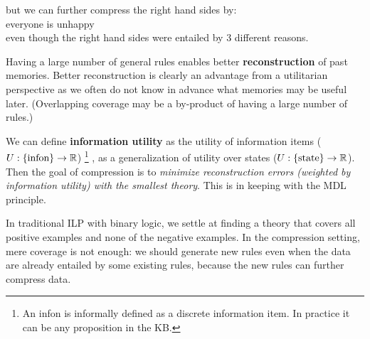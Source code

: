 but we can further compress the right hand sides by:\\
\hspace*{1cm} everyone is unhappy\\
even though the right hand sides were entailed by 3 different reasons.

Having a large number of general rules enables better \textbf{reconstruction} of past memories.  Better reconstruction is clearly an advantage from a utilitarian perspective as we often do not know in advance what memories may be useful later.  (Overlapping coverage may be a by-product of having a large number of rules.)

We can define \textbf{information utility} as the utility of information items ($U: \{ \mbox{infon} \} \rightarrow \mathbb{R}$)
\footnote{An infon is informally defined as a discrete information item.  In practice it can be any proposition in the KB.}
, as a generalization of utility over states ($U: \{ \mbox{state} \} \rightarrow \mathbb{R}$).  Then the goal of compression is to \textit{minimize reconstruction errors (weighted by information utility) with the smallest theory}.  This is in keeping with the MDL principle.



In traditional ILP with binary logic, we settle at finding a theory that covers all positive examples and none of the negative examples.  In the compression setting, mere coverage is not enough:  we should generate new rules even when the data are already entailed by some existing rules, because the new rules can further compress data.

